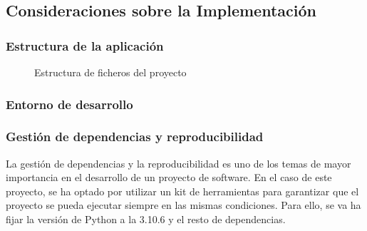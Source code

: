 \subsection{Consideraciones sobre la Implementación}
\subsubsection{Estructura de la aplicación}

\begin{figure}
\caption{Estructura de ficheros del proyecto}
\label{fig:estrcutra-ficheros}
\end{figure}

\subsubsection{Entorno de desarrollo}

\subsubsection{Gestión de dependencias y reproducibilidad}
La gestión de dependencias y la reproducibilidad es uno de los temas de mayor importancia en el 
desarrollo de un proyecto de software. En el caso de este proyecto, se ha optado por utilizar 
un kit de herramientas para garantizar que el proyecto se pueda ejecutar siempre en las mismas 
condiciones. Para ello, se va ha fijar la versión de Python a la 3.10.6 y el resto de dependencias. 

